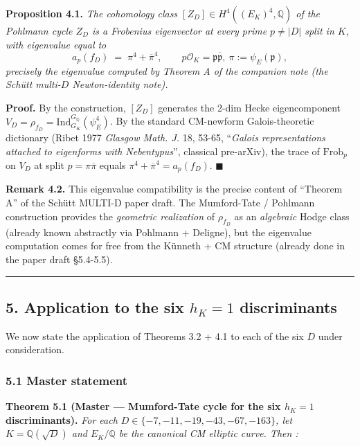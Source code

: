 \documentclass[
  11pt,
  a4paper,
]{article}
\begin{document}
\textbf{Proposition 4.1.} \emph{The cohomology class \([Z_D] \in H^4((E_K)^4, \mathbb{Q})\) of the Pohlmann cycle \(Z_D\) is a Frobenius eigenvector at every prime \(p \neq |D|\) split in \(K\), with eigenvalue equal to}
\[
a_p(f_D) \;=\; \pi^4 + \overline{\pi}^4, \qquad p \mathcal{O}_K = \mathfrak{p} \overline{\mathfrak{p}},\ \pi := \psi_E(\mathfrak{p}),
\]
\emph{precisely the eigenvalue computed by Theorem A of the companion note (the Schütt multi-$D$ Newton-identity note).}

\textbf{Proof.} By the construction, \([Z_D]\) generates the 2-dim Hecke eigencomponent \(V_D = \rho_{f_D} = \mathrm{Ind}_{G_K}^{G_\mathbb{Q}}(\psi_E^4)\). By the standard CM-newform Galois-theoretic dictionary (Ribet 1977 \emph{Glasgow Math. J.} 18, 53-65, ``\emph{Galois representations attached to eigenforms with Nebentypus}'', classical pre-arXiv), the trace of \(\mathrm{Frob}_p\) on \(V_D\) at split \(p = \pi \overline{\pi}\) equals \(\pi^4 + \overline{\pi}^4 = a_p(f_D)\). \(\blacksquare\)

\textbf{Remark 4.2.} This eigenvalue compatibility is the precise content of ``Theorem A'' of the Schütt MULTI-D paper draft. The Mumford-Tate / Pohlmann construction provides the \emph{geometric realization} of \(\rho_{f_D}\) as an \emph{algebraic} Hodge class (already known abstractly via Pohlmann + Deligne), but the eigenvalue computation comes for free from the Künneth + CM structure (already done in the paper draft §5.4-5.5).

\begin{center}\rule{0.5\linewidth}{0.5pt}\end{center}

\hypertarget{application-to-the-six-h_k-1-discriminants}{%
\subsection{\texorpdfstring{5. Application to the six \(h_K = 1\) discriminants}{5. Application to the six h\_K = 1 discriminants}}\label{application-to-the-six-h_k-1-discriminants}}

We now state the application of Theorems 3.2 + 4.1 to each of the six \(D\) under consideration.

\hypertarget{master-statement}{%
\subsubsection{5.1 Master statement}\label{master-statement}}

\textbf{Theorem 5.1 (Master --- Mumford-Tate cycle for the six \(h_K = 1\) discriminants).} \emph{For each \(D \in \{-7, -11, -19, -43, -67, -163\}\), let \(K = \mathbb{Q}(\sqrt{D})\) and \(E_K / \mathbb{Q}\) be the canonical CM elliptic curve. Then :}
\end{document}
